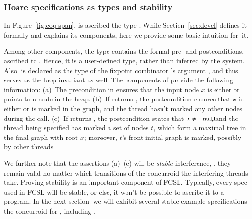 \subsubsection{Hoare specifications as types and stability}
\label{sec:semi-formal-spec}
%
In Figure~\ref{fig:coq-span},  is ascribed the type
. While Section~\ref{sec:devel} defines it formally and
explains its components, here we provide some basic intuition for~it.

Among other components, the type  contains the formal
pre- and postconditions, ascribed to . Hence, it is a
user-defined type, rather than inferred by the system. Also,
 is declared as the type of the fixpoint combinator
's argument , and thus serves as the loop
invariant as well. The components of  provide the
following information:
%
(a)~The precondition in  ensures that the input node
$x$ is either  or points to a node in the heap.
%
(b)~If  returns , the postcondition ensures
that $x$ is either  or is marked in the graph, and the
thread hasn't marked any other nodes during the call.
%
(c)~If  returns , the postcondition states that
$x \neq \text{\code{null}}$, and the thread being specified has marked
a set of nodes $t$, which form a maximal tree in the final graph with
root $x$; moreover, $t$'s front \wrt initial graph is marked, possibly
by other threads.
%

We further note that the assertions (a)--(c) will be \emph{stable}
\wrt interference, \ie, they remain valid no matter which transitions
of the  concurroid the interfering threads take. 
%
%
Proving stability is an important component of FCSL. Typically, every
spec used in FCSL will be stable, or else, it won't be possible to
ascribe it to a program. In the next section, we will exhibit several
stable example specifications \wrt the concurroid for ,
including .


